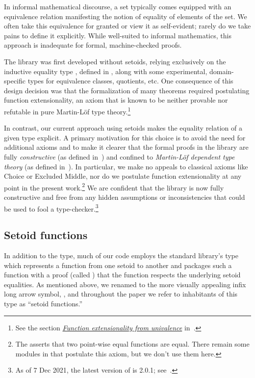 In informal mathematical discourse, a set typically comes equipped with an equivalence
relation manifesting the notion of equality of elements of the set. We
often take this equivalence for granted or view it as self-evident; rarely do we
take pains to define it explicitly. While well-suited to informal
mathematics, this approach is inadequate for formal, machine-checked proofs.

The \agdaalgebras library was first developed without setoids, relying exclusively
on the inductive equality type , defined in ,
along with some experimental, domain-specific types for equivalence classes, quotients, etc.
One consequence of this design decision was that the formalization of many
theorems required postulating function extensionality, an axiom that is known to be neither provable
nor refutable in pure Martin-Löf type theory.\footnote{See the section
\href{https://www.cs.bham.ac.uk/~mhe/HoTT-UF-in-Agda-Lecture-Notes/HoTT-UF-Agda.html\#funextfromua}
{\textit{Function extensionality from univalence}} in~\cite{MHE, MHE:2019}.}

In contrast, our current approach using setoids makes the equality relation
of a given type explicit.  A primary motivation for this choice is to avoid the need for
additional axioms and to make it clearer that the formal proofs in the \agdaalgebras
library are fully \emph{constructive} (as defined in~\cite{nlab:constructive_mathematics})
and confined to \emph{Martin-Löf dependent type theory} (as defined in~\cite{nlab:martin-loef_dependent_type_theory}).
In particular, we make no appeals to classical axioms like Choice or Excluded Middle, nor
do we postulate function extensionality at any point in the present work.\footnote{The  asserts that two point-wise equal functions are equal. There remain some modules in
\agdaalgebras that postulate this axiom, but we don't use them here.}
We are confident that the \agdaalgebras library is now fully constructive and free from any hidden
assumptions or inconsistencies that could be used to fool a type-checker.\footnote{As of 7 Dec 2021, the latest version of \agdaalgebras is 2.0.1; see~\cite{ualib_v2.0.1}.}


\subsection{Setoid functions}
\label{setoid-functions}
In addition to the  type, much of our code employs the
standard library's  type which represents a function from one
setoid to another and packages such a function with a proof (called ) that
the function respects the underlying setoid equalities. As mentioned above, we renamed
 to the more visually appealing infix long arrow symbol,
, and  throughout the paper we
refer to inhabitants of this type as ``setoid functions.''

